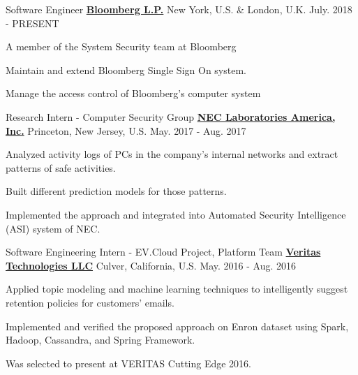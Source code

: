 

\begin{cventries}
\cventry
{Software Engineer} %
{\href{http://www.bloomberg.com/}{\bf Bloomberg L.P.}}  %
{New York, U.S. \& London, U.K.} %
{July. 2018 - PRESENT} %
{
		\begin{cvitems} %
			\item A member of the System Security team at Bloomberg
			\item Maintain and extend Bloomberg Single Sign On system.
			\item Manage the access control of Bloomberg's computer system
		\end{cvitems}
}


\cventry
{Research Intern - Computer Security Group} %
{\href{http://www.nec-labs.com/}{\bf NEC Laboratories America, Inc.}}  %
{Princeton, New Jersey, U.S.} %
{May. 2017 - Aug. 2017} %
{
	\begin{cvitems} %
		\item Analyzed activity logs of PCs in the company's internal networks and extract patterns of safe activities.
		\item Built different prediction models for those patterns.
		\item Implemented the approach and integrated into Automated Security Intelligence (ASI) system of NEC.
	\end{cvitems}
}
	
	
\cventry
{Software Engineering Intern - EV.Cloud Project, Platform Team} %
{\href{https://www.veritas.com/}{\bf Veritas Technologies LLC}}  %
{Culver, California, U.S.} %
{May. 2016 - Aug. 2016} %
{
	\begin{cvitems} %
		\item Applied topic modeling and machine learning techniques to intelligently suggest retention policies for customers' emails.
		\item Implemented and verified the proposed approach on Enron dataset using Spark, Hadoop, Cassandra, and Spring Framework.
		\item Was selected to present at VERITAS Cutting Edge 2016.
	\end{cvitems}
}


\end{cventries}
